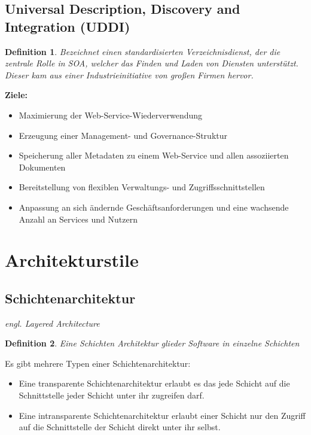 \documentclass[a4paper]{article}
\theoremstyle{break}
\newtheorem{defi}{Definition}[section]
\begin{document}
\subsection{Universal Description, Discovery and Integration (UDDI)}
\begin{defi}
	Bezeichnet einen standardisierten Verzeichnisdienst, der die zentrale Rolle in SOA, welcher das Finden und Laden von Diensten unterstützt. Dieser kam aus einer Industrieinitiative von großen Firmen hervor.
\end{defi}
\textbf{Ziele:}
\begin{itemize}
	\item Maximierung der Web-Service-Wiederverwendung
	\item Erzeugung einer Management- und Governance-Struktur
	\item Speicherung aller Metadaten zu einem Web-Service und allen assoziierten Dokumenten
	\item Bereitstellung von flexiblen Verwaltungs- und Zugriffsschnittstellen
	\item Anpassung an sich ändernde Geschäftsanforderungen und eine wachsende Anzahl an Services und Nutzern
\end{itemize}
\section{Architekturstile}
\subsection{Schichtenarchitektur}
\textit{engl. Layered Architecture}

\begin{defi}
	Eine Schichten Architektur glieder Software in einzelne Schichten
\end{defi}
Es gibt mehrere Typen einer Schichtenarchitektur: 
\begin{itemize}
	\item Eine transparente Schichtenarchitektur erlaubt es das jede Schicht auf die Schnittstelle jeder Schicht unter ihr zugreifen darf.
	\item Eine intransparente Schichtenarchitektur erlaubt einer Schicht nur den Zugriff auf die Schnittstelle der Schicht direkt unter ihr selbst.
\end{itemize}
\end{document}
